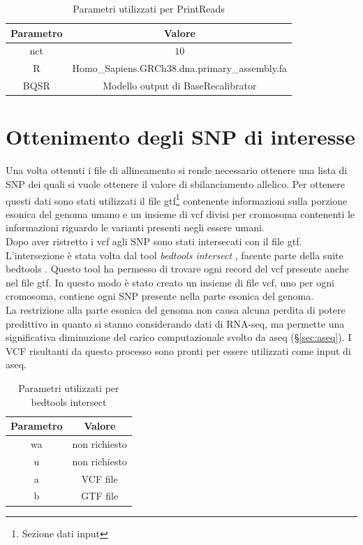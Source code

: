     \begin{table}[H]
        \centering
        \begin{tabular}{|c|c|}
                \hline
                Parametro & Valore\\
                \hline
                nct & $10$\\
                \hline
                R & Homo\_Sapiens.GRCh38.dna.primary\_assembly.fa\\
                \hline
                BQSR & Modello output di BaseRecalibrator\\
                \hline
         \end{tabular}
         \caption{Parametri utilizzati per PrintReads}
    \end{table}
    

  \section{Ottenimento degli SNP di interesse}
  Una volta ottenuti i file di allineamento si rende necessario ottenere una lista di SNP dei quali si vuole ottenere il valore di sbilanciamento allelico.
  Per ottenere questi dati sono stati utilizzati il file gtf\footnote{Sezione dati input} contenente informazioni sulla porzione esonica del genoma umano e un insieme di vcf divisi per cromosoma contenenti le informazioni riguardo le varianti presenti negli essere umani.\\
  Dopo aver ristretto i vcf agli SNP sono stati intersecati con il file gtf.
  L'intersezione \`e stata volta dal tool \emph{bedtools intersect} \cite{bedtoolsintersect}, facente parte della suite bedtools \cite{bedtools}.
  Questo tool ha permesso di trovare ogni record del vcf presente anche nel file gtf.
  In questo modo \`e stato creato un insieme di file vcf, uno per ogni cromosoma, contiene ogni SNP presente nella parte esonica del genoma.\\
  La restrizione alla parte esonica del genoma non causa alcuna perdita di potere predittivo in quanto si stanno considerando dati di RNA-seq, ma permette una significativa diminuzione del carico computazionale svolto da aseq (\S\ref{sec:aseq}).
  I VCF risultanti da questo processo sono pronti per essere utilizzati come input di aseq.
  \begin{table}[H]
        \centering
        \begin{tabular}{|c|c|}
                \hline
                Parametro & Valore\\
                \hline
                wa & non richiesto\\
                \hline
                u & non richiesto\\
                \hline
                a & VCF file\\
                \hline
                b & GTF file\\
                \hline
         \end{tabular}
         \caption{Parametri utilizzati per bedtools intersect}
  \end{table}

